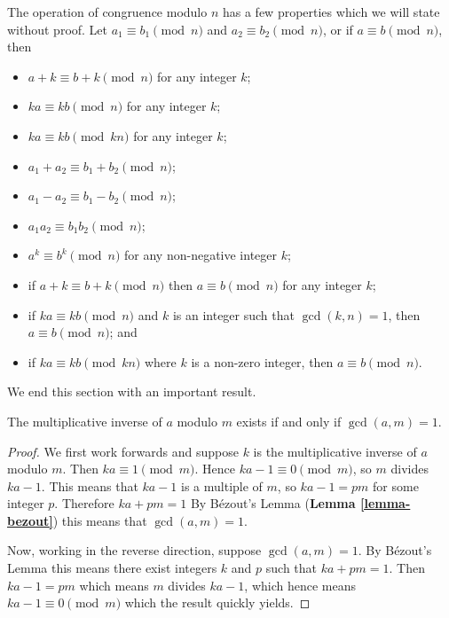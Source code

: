 The operation of congruence modulo $n$ has a few properties which we will state without proof. Let $a_1 \equiv b_1 \pmod n$ and $a_2 \equiv b_2 \pmod n$, or if $a \equiv b \pmod n$, then
\begin{itemize}
    \item $a + k \equiv b + k \pmod n$ for any integer $k$;
    \item $ka \equiv kb \pmod n$ for any integer $k$;
    \item $ka \equiv kb \pmod {kn}$ for any integer $k$;
    \item $a_1 + a_2 \equiv b_1 + b_2 \pmod n$;
    \item $a_1 - a_2 \equiv b_1 - b_2 \pmod n$;
    \item $a_1a_2 \equiv b_1b_2 \pmod n$;
    \item $a^k \equiv b^k \pmod n$ for any non-negative integer $k$;
    \item if $a+k \equiv b+k \pmod n$ then $a \equiv b \pmod n$ for any integer $k$;
    \item if $ka \equiv kb \pmod n$ and $k$ is an integer such that $\gcd(k, n) = 1$, then $a \equiv b \pmod n$; and
    \item if $ka \equiv kb \pmod{kn}$ where $k$ is a non-zero integer, then $a \equiv b \pmod n$.
\end{itemize}

We end this section with an important result.
\begin{proposition}\label{prop-multiplicative-inverse-exists-iff-coprime}
    The multiplicative inverse of $a$ modulo $m$ exists if and only if $\gcd(a,m) = 1$.
\end{proposition}
\begin{proof}
    We first work forwards and suppose $k$ is the multiplicative inverse of $a$ modulo $m$. Then $ka \equiv 1 \pmod m$. Hence $ka - 1 \equiv 0 \pmod m$, so $m$ divides $ka - 1$. This means that $ka - 1$ is a multiple of $m$, so $ka - 1 = pm$ for some integer $p$. Therefore $ka + pm = 1$ By Bézout's Lemma (\textbf{Lemma \ref{lemma-bezout}}) this means that $\gcd(a, m) = 1$.
    
    Now, working in the reverse direction, suppose $\gcd(a, m) = 1$. By Bézout's Lemma this means there exist integers $k$ and $p$ such that $ka + pm = 1$. Then $ka - 1 = pm$ which means $m$ divides $ka - 1$, which hence means $ka - 1 \equiv 0 \pmod m$ which the result quickly yields.
\end{proof}

